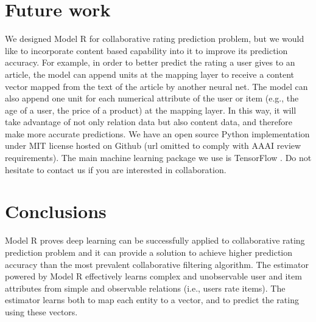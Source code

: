 \documentclass[letterpaper]{article}
\begin{document}
\section{Future work}
We designed Model R for collaborative rating prediction problem,
but we would like to incorporate content based capability into it to improve 
its prediction accuracy.
For example, in order to better predict the rating a user gives to an article,
the model can append units at the mapping layer to receive a content vector 
mapped from the text of the article by another neural net.
The model can also append one unit for each numerical attribute of the user or 
item (e.g., the age of a user, the price of a product) at the mapping layer.
In this way, it will take advantage of not only relation data but also content 
data, and therefore make more accurate predictions.
We have an open source Python implementation under MIT license hosted on Github 
(url omitted to comply with AAAI review requirements).
The main machine learning package we use is TensorFlow 
\cite{abadi2016tensorflow}.
Do not hesitate to contact us if you are interested in collaboration.

\section{Conclusions}
Model R proves deep learning can be successfully applied to collaborative 
rating prediction problem and it can provide a solution to achieve higher 
prediction accuracy than the most prevalent collaborative filtering algorithm.
The estimator powered by Model R effectively learns complex and unobservable 
user and item attributes from simple and observable relations (i.e., users rate 
items).
The estimator learns both to map each entity to a vector, and to predict 
the rating using these vectors.




\end{document}
